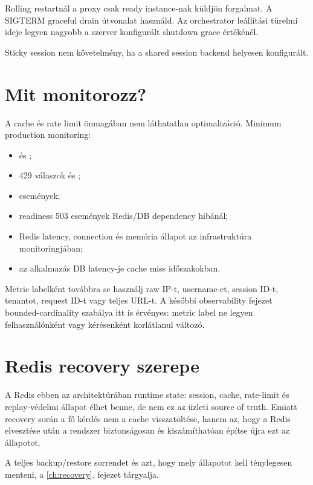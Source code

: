 Rolling restartnál a proxy csak ready instance-nak küldjön forgalmat. A SIGTERM graceful drain útvonalat használd. Az orchestrator leállítási türelmi ideje legyen nagyobb a szerver konfigurált shutdown grace értékénél.

Sticky session nem követelmény, ha a shared session backend helyesen konfigurált.

\section{Mit monitorozz?}

A cache és rate limit önmagában nem láthatatlan optimalizáció. Minimum production monitoring:

\begin{itemize}
  \item {} és ;
  \item 429 válaszok és ;
  \item {} események;
  \item readiness 503 események Redis/DB dependency hibánál;
  \item Redis latency, connection és memória állapot az infrastruktúra monitoringjában;
  \item az alkalmazás DB latency-je cache miss időszakokban.
\end{itemize}

Metric labelként továbbra se használj raw IP-t, username-et, session ID-t, tenantot, request ID-t vagy teljes URL-t. A későbbi observability fejezet bounded-cardinality szabálya itt is érvényes: metric label ne legyen felhasználónként vagy kérésenként korlátlanul változó.

\section{Redis recovery szerepe}

A Redis ebben az architektúrában runtime state: session, cache, rate-limit és replay-védelmi állapot élhet benne, de nem ez az üzleti source of truth. Emiatt recovery során a fő kérdés nem a cache visszatöltése, hanem az, hogy a Redis elvesztése után a rendszer biztonságosan és kiszámíthatóan építse újra ezt az állapotot.

A teljes backup/restore sorrendet és azt, hogy mely állapotot kell ténylegesen menteni, a \ref{ch:recovery}. fejezet tárgyalja.

